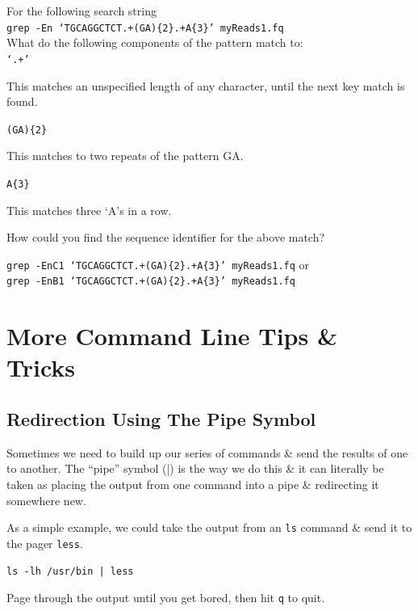 \documentclass[a4paper,12pt,twoside]{memoir}
\begin{document}
\begin{questions}
For the following search string \\
\texttt{grep -En `TGCAGGCTCT.+(GA)\{2\}.+A\{3\}' myReads1.fq} \\
What do the following components of the pattern match to: \\
\texttt{`.+'} \\
\begin{answer}
This matches an unspecified length of any character, until the next key match is found. \\
\end{answer}

\texttt{(GA)\{2\}} \\
\begin{answer}
This matches to two repeats of the pattern GA. \\
\end{answer}

\texttt{A\{3\}}\\
\begin{answer}
This matches three `A's in a row. \\
\end{answer}

How could you find the sequence identifier for the above match?\\
\begin{answer}
\texttt{grep -EnC1 `TGCAGGCTCT.+(GA)\{2\}.+A\{3\}' myReads1.fq} or \\
\texttt{grep -EnB1 `TGCAGGCTCT.+(GA)\{2\}.+A\{3\}' myReads1.fq}
\end{answer}
\end{questions}

\chapter{More Command Line Tips \& Tricks}

\section{Redirection Using The Pipe Symbol}
\begin{information}
Sometimes we need to build up our series of commands \& send the results of one to another.
The ``pipe'' symbol (|) is the way we do this \& it can literally be taken as placing the output from one command into a pipe \& redirecting it somewhere new.
\end{information}
\begin{steps}
As a simple example, we could take the output from an \texttt{ls} command \& send it to the pager \texttt{less}.
\end{steps}
\begin{lstlisting}
ls -lh /usr/bin | less
\end{lstlisting}
Page through the output until you get bored, then hit \texttt{q} to quit.
\end{document}
